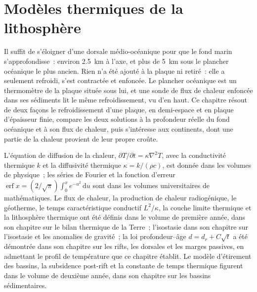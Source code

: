 \chapter{Modèles thermiques de la lithosphère}\label{ch:b3:lithosphere-thermal-models}

Il suffit de s'éloigner d'une dorsale médio-océanique pour que le fond marin s'approfondisse~: environ
\qty{2.5}{km} à l'axe, et plus de \qty{5}{km} sous le plancher océanique le plus ancien.
Rien n'a été ajouté à la plaque ni retiré~: elle a seulement
refroidi, s'est contractée et enfoncée. Le plancher océanique est un thermomètre de la plaque
située sous lui, et une sonde de flux de chaleur enfoncée dans ses sédiments lit le même
refroidissement, vu d'en haut. Ce chapitre résout de deux façons le refroidissement d'une plaque,
en demi-espace et en plaque d'épaisseur finie, compare les deux solutions à la profondeur
réelle du fond océanique et à son flux de chaleur, puis s'intéresse aux continents,
dont une partie de la chaleur provient de leur propre croûte.

\begin{recall}
L'équation de diffusion de la chaleur, $\partial T/\partial t = \kappa\nabla^2T$,
avec la conductivité thermique $k$ et la diffusivité thermique $\kappa =
k/(\rho c)$, est donnée dans les volumes de physique~; les séries de Fourier et la fonction d'erreur
$\operatorname{erf}x = (2/\sqrt\pi)\int_0^xe^{-u^2}\,\mathrm du$ sont dans les
volumes universitaires de mathématiques. Le flux de chaleur, la production de chaleur
radiogénique, le géotherme, le temps caractéristique conductif $L^2/\kappa$, la
couche limite thermique et la lithosphère thermique ont été définis dans le volume de première année,
dans son chapitre sur le bilan thermique de la Terre~; l'isostasie dans son chapitre
sur l'isostasie et les anomalies de gravité~; la loi profondeur--âge $d = d_r + C\sqrt t$ a été
démontrée dans son chapitre sur les rifts, les dorsales et les marges passives, en admettant le
profil de température que ce chapitre établit. Le modèle d'étirement des bassins, la
subsidence post-rift et la constante de temps thermique figurent dans le volume de deuxième année, dans son
chapitre sur les bassins sédimentaires.
\end{recall}

